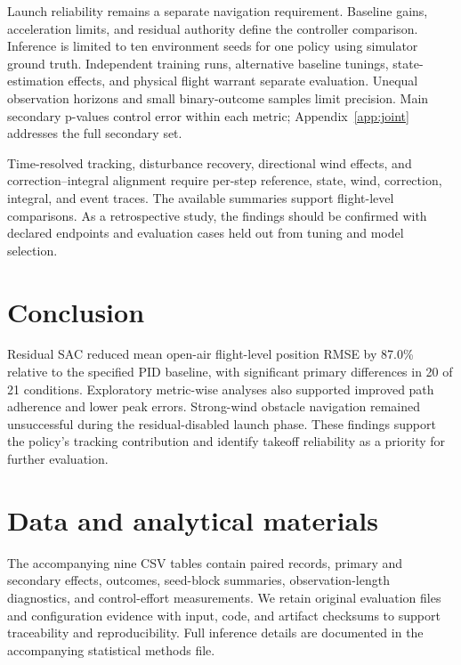 \documentclass[11pt,a4paper]{article}
\begin{document}
Launch reliability remains a separate navigation requirement. Baseline gains, acceleration limits, and residual authority define the controller comparison. Inference is limited to ten environment seeds for one policy using simulator ground truth. Independent training runs, alternative baseline tunings, state-estimation effects, and physical flight warrant separate evaluation. Unequal observation horizons and small binary-outcome samples limit precision. Main secondary p-values control error within each metric; Appendix~\ref{app:joint} addresses the full secondary set.

Time-resolved tracking, disturbance recovery, directional wind effects, and correction--integral alignment require per-step reference, state, wind, correction, integral, and event traces. The available summaries support flight-level comparisons. As a retrospective study, the findings should be confirmed with declared endpoints and evaluation cases held out from tuning and model selection.

\section{Conclusion}
Residual SAC reduced mean open-air flight-level position RMSE by 87.0\% relative to the specified PID baseline, with significant primary differences in 20 of 21 conditions. Exploratory metric-wise analyses also supported improved path adherence and lower peak errors. Strong-wind obstacle navigation remained unsuccessful during the residual-disabled launch phase. These findings support the policy's tracking contribution and identify takeoff reliability as a priority for further evaluation.

\section*{Data and analytical materials}
The accompanying nine CSV tables contain paired records, primary and secondary effects, outcomes, seed-block summaries, observation-length diagnostics, and control-effort measurements. We retain original evaluation files and configuration evidence with input, code, and artifact checksums to support traceability and reproducibility. Full inference details are documented in the accompanying statistical methods file.
\end{document}
